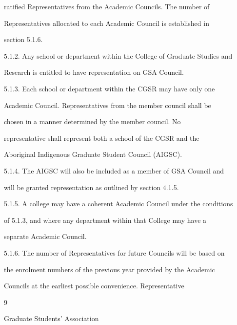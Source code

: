         ratified Representatives from the Academic Councils. The number of  

        Representatives allocated to each Academic Council is established in  

        section 5.1.6.  



5.1.2. Any school or department within the College of Graduate Studies and  

        Research is entitled to have representation on GSA Council.  



5.1.3. Each  school  or  department  within  the  CGSR  may  have  only  one  

        Academic Council. Representatives from the member council shall be  

        chosen     in   a   manner      determined      by    the   member       council.    No  

        representative  shall  represent  both  a  school  of  the  CGSR  and  the  

        Aboriginal Indigenous Graduate Student Council (AIGSC).  



5.1.4. The AIGSC will also be included as a member of GSA Council and  

        will be granted representation as outlined by section 4.1.5.  



5.1.5. A college may have a coherent Academic Council under the conditions  

        of  5.1.3, and where any department within that College may have a  

        separate  Academic Council.  



5.1.6. The  number  of  Representatives  for  future  Councils  will  be  based  on  

        the enrolment numbers of the previous year provided by the Academic  

        Councils      at   the    earliest    possible     convenience.       Representative  

                                                

                                              9  



                               Graduate Students’ Association  



